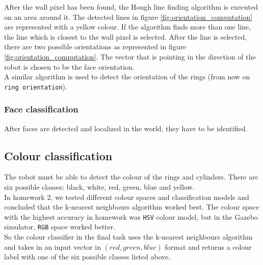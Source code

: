 \documentclass[12pt,a4paper]{article}
\begin{document}
	After the wall pixel has been found, the Hough line finding algorithm is executed on an area around it. The detected lines in figure \ref{fig:orientation_computation} are represented with a yellow colour. If the algorithm finds more than one line, the line which is closest to the wall pixel is selected. After the line is selected, there are two possible orientations as represented in figure \ref{fig:orientation_computation}. The vector that is pointing in the direction of the robot is chosen to be the face orientation. \\ 
	
	A similar algorithm is used to detect the orientation of the rings (from now on \texttt{ring orientation}).
	
	\subsubsection{Face classification}
	After faces are detected and localized in the world, they have to be identified.
	
	\subsection{Colour classification} \label{colour_classification}
	The robot must be able to detect the colour of the rings and cylinders. There are six possible classes: black, white, red, green, blue and yellow. \\
	
	In homework 2, we tested different colour spaces and classification models and concluded that the k-nearest neighbours algorithm worked best. The colour space with the highest accuracy in homework was \texttt{HSV} colour model, but in the Gazebo simulator, \texttt{RGB} space worked better. \\
	
	So the colour classifier in the final task uses the k-nearest neighbours algorithm and takes in an input vector in $(red, green, blue)$ format and returns a colour label with one of the six possible classes listed above. \\
	
\end{document}
